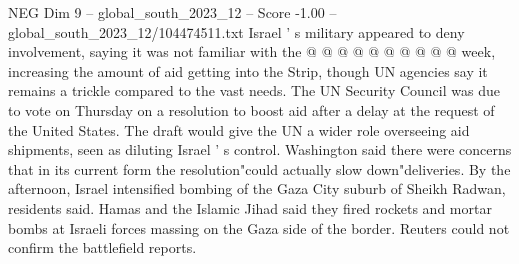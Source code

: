 \begin{textsample}{NEG Dim 9 – global\_south\_2023\_12 – Score -1.00 – global\_south\_2023\_12/104474511.txt}
Israel ' s military appeared to deny involvement, saying it was not familiar with the @ @ @ @ @ @ @ @ @ @ week, increasing the amount of aid getting into the Strip, though UN agencies say it remains a trickle compared to the vast needs.
The UN Security Council was due to vote on Thursday on a resolution to boost aid after a delay at the request of the United States.
The draft would give the UN a wider role overseeing aid shipments, seen as diluting Israel ' s control.
Washington said there were concerns that in its current form the resolution"could actually slow down"deliveries.
By the afternoon, Israel intensified bombing of the Gaza City suburb of Sheikh Radwan, residents said.
Hamas and the Islamic Jihad said they fired rockets and mortar bombs at Israeli forces massing on the Gaza side of the border.
Reuters could not confirm the battlefield reports.

\end{textsample}
